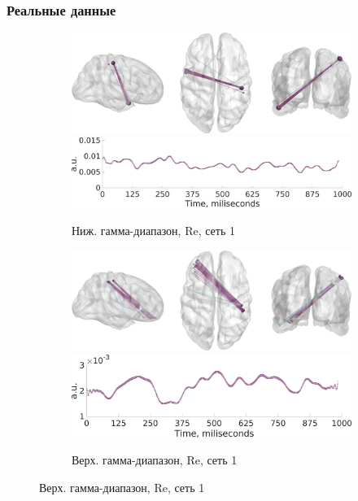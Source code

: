 \documentclass[12pt]{beamer}
\begin{document}
\begin{frame}[t]
    \frametitle{Реальные данные}
    \begin{figure}
    \centering
     \begin{subfigure}[b]{0.4\textwidth}
     \includegraphics[width=\textwidth]{../images/psiicos_paper/Figure13_a1.jpg}
     \includegraphics[width=\textwidth]{../images/psiicos_paper/Figure13_a2.jpg}
     \caption{\tiny Ниж. гамма-диапазон, Re, сеть 1}\label{fig:13a}
     \end{subfigure}
     \hspace{1cm}
     \begin{subfigure}[b]{0.4\textwidth}
     \includegraphics[width=\textwidth]{../images/psiicos_paper/Figure13_b1.jpg}
     \includegraphics[width=\textwidth]{../images/psiicos_paper/Figure13_b2.jpg}
     \caption{\tiny Верх. гамма-диапазон, Re, сеть 1}\label{fig:13b}
     \end{subfigure}


\end{figure}
\end{frame}
\end{document}
